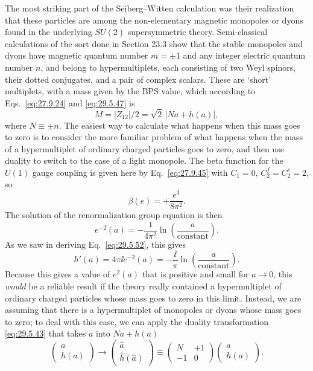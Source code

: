 The most striking part of the Seiberg--Witten calculation was their
realization that these particles are among the non-elementary magnetic
monopoles or dyons found in the underlying \(SU(2)\) supersymmetric theory.
Semi-classical calculations of the sort done in Section 23.3 show that the
stable monopoles and dyons have magnetic quantum number \(m=\pm1\) and any
integer electric quantum number \(n\), and belong to hypermultiplets, each
consisting of two Weyl spinors, their dotted conjugates, and a pair of
complex scalars.
These are `short' multiplets, with a mass given by the BPS value, which
according to Eqs.~\eqref{eq:27.9.24} and \eqref{eq:29.5.47} is
\begin{equation}
  M=\lvert Z_{12}\rvert/2
  =\sqrt{2}\,\lvert Na+h(a)\rvert,
  \tag{29.5.58}\label{eq:29.5.58}
\end{equation}
where \(N\equiv\pm n\). The easiest way to calculate what happens when this
mass goes to zero is to consider the more familiar problem of what happens
when the mass of a hypermultiplet of ordinary charged particles goes to
zero, and then use duality to switch to the case of a light monopole. The
beta function for the \(U(1)\) gauge coupling is given here by
Eq.~\eqref{eq:27.9.45} with \(C_1=0\), \(C_2^f=C_2^s=2\), so
\[
  \beta(e)=+\frac{e^3}{8\pi^2}.
\]
The solution of the renormalization group equation is then
\[
  e^{-2}(a)
  =-\frac{1}{4\pi^2}\ln\left(\frac{a}{\text{constant}}\right).
\]
As we saw in deriving Eq.~\eqref{eq:29.5.52}, this gives
\[
  h'(a)=4\pi \ii e^{-2}(a)
  =-\frac{\ii}{\pi}\ln\left(\frac{a}{\text{constant}}\right).
\]
Because this gives a value of \(e^2(a)\) that is positive and small for
\(a\longrightarrow0\), this \textit{would} be a reliable result if the
theory really contained a hypermultiplet of ordinary charged particles whose
mass goes to zero in this limit. Instead, we are assuming that there is a
hypermultiplet of monopoles or dyons whose mass goes to zero; to deal with
this case, we can apply the duality transformation \eqref{eq:29.5.43} that
takes \(a\) into \(Na+h(a)\)
\begin{equation}
  \begin{pmatrix}
    a\\ h(a)
  \end{pmatrix}
  \longrightarrow
  \begin{pmatrix}
    \widehat a\\ \widehat h(\widehat a)
  \end{pmatrix}
  \equiv
  \begin{pmatrix}
    N&+1\\ -1&0
  \end{pmatrix}
  \begin{pmatrix}
    a\\ h(a)
  \end{pmatrix}.
  \tag{29.5.59}\label{eq:29.5.59}
\end{equation}
